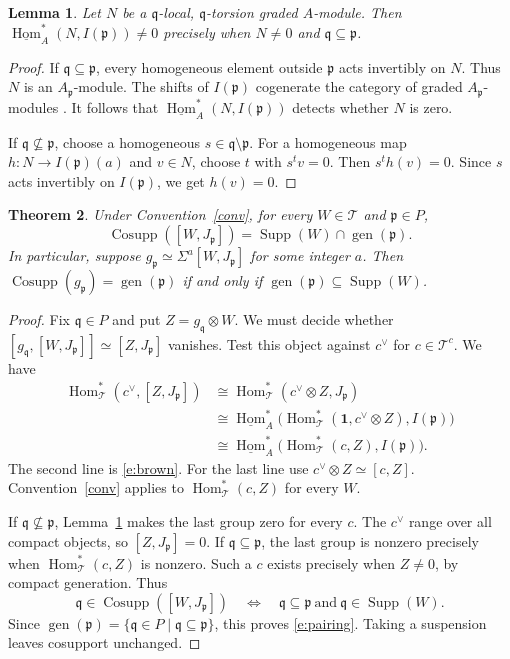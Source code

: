 \documentclass[11pt,reqno]{amsart}
\newtheorem{theorem}{Theorem}[section]
\newtheorem{lemma}[theorem]{Lemma}
\theoremstyle{definition}
\DeclareMathOperator{\Cosupp}{Cosupp}
\DeclareMathOperator{\Supp}{Supp}
\DeclareMathOperator{\gen}{gen}
\DeclareMathOperator{\Hom}{Hom}
\newcommand{\T}{\mathcal T}
\newcommand{\one}{\mathbf 1}
\newcommand{\p}{\mathfrak p}
\newcommand{\q}{\mathfrak q}
\numberwithin{equation}{section}
\begin{document}
\begin{lemma}\label{l:test}
Let $N$ be a $\q$-local, $\q$-torsion graded $A$-module. Then
$\underline{\Hom}^*_A(N,I(\p))\ne0$ precisely when $N\ne0$ and $\q\subseteq\p$.
\end{lemma}
\begin{proof}
If $\q\subseteq\p$, every homogeneous element outside $\p$ acts invertibly on $N$. Thus $N$ is an $A_{\p}$-module. The shifts of $I(\p)$ cogenerate the category of graded $A_{\p}$-modules \cite[proof of Proposition~5.4]{bik}. It follows that $\underline{\Hom}_A^*(N,I(\p))$ detects whether $N$ is zero.

If $\q\not\subseteq\p$, choose a homogeneous $s\in\q\setminus\p$. For a homogeneous map $h:N\to I(\p)(a)$ and $v\in N$, choose $t$ with $s^tv=0$. Then $s^th(v)=0$. Since $s$ acts invertibly on $I(\p)$, we get $h(v)=0$.
\end{proof}

\begin{theorem}\label{t:pairing}
Under Convention~\ref{conv}, for every $W\in\T$ and $\p\in P$,
\begin{equation}\label{e:pairing}
 \Cosupp([W,J_{\p}])=\Supp(W)\cap\gen(\p).
\end{equation}
In particular, suppose $g_{\p}\simeq\Sigma^a[W,J_{\p}]$ for some integer $a$. Then $\Cosupp(g_{\p})=\gen(\p)$ if and only if $\gen(\p)\subseteq\Supp(W)$.
\end{theorem}
\begin{proof}
Fix $\q\in P$ and put $Z=g_{\q}\otimes W$. We must decide whether $[g_{\q},[W,J_{\p}]]\simeq[Z,J_{\p}]$ vanishes. Test this object against $c^\vee$ for $c\in\T^c$. We have
\begin{align*}
 \Hom^*_{\T}(c^\vee,[Z,J_{\p}])
 &\cong \Hom^*_{\T}(c^\vee\otimes Z,J_{\p})\\
 &\cong \underline{\Hom}^*_A
       \big(\Hom_{\T}^*(\one,c^\vee\otimes Z),I(\p)\big)\\
 &\cong \underline{\Hom}^*_A
       \big(\Hom_{\T}^*(c,Z),I(\p)\big).
\end{align*}
The second line is \eqref{e:brown}. For the last line use $c^\vee\otimes Z\simeq[c,Z]$. Convention~\ref{conv} applies to $\Hom_{\T}^*(c,Z)$ for every $W$.

If $\q\not\subseteq\p$, Lemma~\ref{l:test} makes the last group zero for every $c$. The $c^\vee$ range over all compact objects, so $[Z,J_{\p}]=0$. If $\q\subseteq\p$, the last group is nonzero precisely when $\Hom^*_{\T}(c,Z)$ is nonzero. Such a $c$ exists precisely when $Z\ne0$, by compact generation. Thus
\[
 \q\in\Cosupp([W,J_{\p}])
 \quad\Longleftrightarrow\quad \q\subseteq\p\ \text{and}\ \q\in\Supp(W).
\]
Since $\gen(\p)=\{\q\in P\mid\q\subseteq\p\}$, this proves \eqref{e:pairing}. Taking a suspension leaves cosupport unchanged.
\end{proof}
\end{document}
